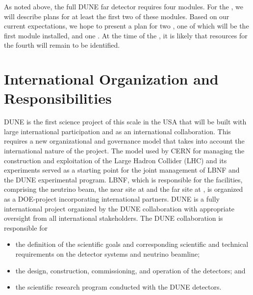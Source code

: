 As noted above, the full DUNE far detector requires four modules. For the , we will describe plans for at least the first two of these modules. Based on our current expectations, we hope to present a plan for two , one of which will be the first module installed, and one . At the time of the , it is likely that resources for the fourth  will remain to be identified. 


\section{International Organization and Responsibilities}

DUNE is the first science project of this scale in the USA that will be built with large
international participation and as an international collaboration. This requires a new organizational and governance model that takes into account the international nature of the project.
The
model used by CERN for managing the construction and exploitation of the Large Hadron Collider (LHC) and its experiments served as a starting point for the joint management of LBNF and the DUNE experimental program. 
LBNF, which is responsible for the facilities, comprising the neutrino beam, the near site at \fnal and the far site at \surf, is organized as a
DOE-\fnal project incorporating international partners. 
DUNE is a fully international project
organized by the DUNE collaboration with appropriate oversight from all international stakeholders.
The DUNE collaboration is responsible for
\begin{itemize}
\item the definition of the scientific goals and corresponding scientific and technical requirements on the detector systems and neutrino beamline;
\item the design, construction, commissioning, and operation of the detectors; and
\item the scientific research program conducted with the DUNE detectors. 
\end{itemize}

